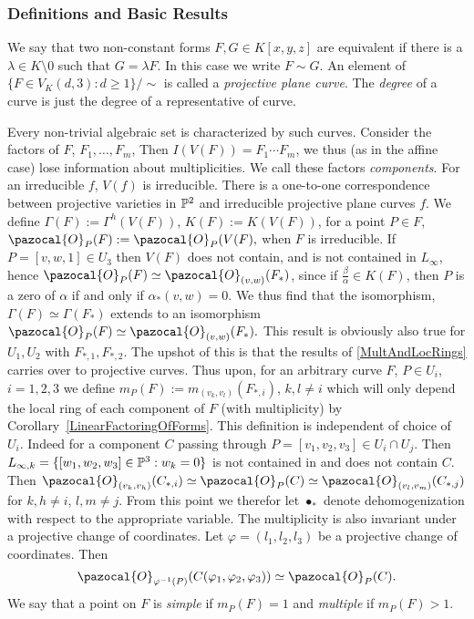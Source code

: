 \subsubsection{Definitions and Basic Results}
    \begin{definition}
        We say that two non-constant forms $F,G\in K[x,y,z]$ are equivalent if there is a $\lambda\in K\setminus 0$ such that $G=\lambda F$. In this case we write $F\sim G$. An element of $\{F \in V_K(d,3): d\geq 1\}/\sim$ is called a \textit{projective plane curve}. The \textit{degree} of a curve is just the degree of a representative of curve.  
    \end{definition}
    \begin{remark}
        Every non-trivial algebraic set is characterized by such curves. Consider the factors of $F$, $F_1,\dots,F_m$, Then $I(V(F))=F_1\cdots F_m$, we thus (as in the affine case) lose information about multiplicities. We call these factors \textit{components}. For an irreducible $f$, $V(f)$ is irreducible. There is a one-to-one correspondence between projective varieties in $\mathbb{P}^2$ and irreducible projective plane curves $f$. We define $\Gamma(F):= \Gamma^h(V(F))$, $K(F):=K(V(F))$, for a point $P\in F$, $\pazocal{O}_P(F):=\pazocal{O}_P(V(F),$ when $F$ is irreducible. If $P=[v,w,1]\in U_3$ then $V(F)$ does not contain, and is not contained in $L_\infty$, hence $\pazocal{O}_P(F)\simeq \pazocal{O}_{(v,w)}(F_\ast)$, since if $\frac{\beta}{\alpha}\in K(F)$, then $P$ is a zero of $\alpha$ if and only if $\alpha_\ast(v,w)=0$. We thus find that the isomorphism, $\Gamma(F)\simeq \Gamma(F_\ast)$ extends to an isomorphism $\pazocal{O}_P(F)\simeq \pazocal{O}_{(v,w)}(F_\ast).$ This result is obviously also true for $U_1,U_2$ with $F_{\ast,1},F_{\ast,2}$. The upshot of this is that the results of \ref{MultAndLocRings} carries over to projective curves. Thus upon, for an arbitrary curve $F$, $P\in U_i$, $i=1,2,3$ we define $m_P(F):= m_{(v_k,v_l)}(F_{\ast,i})$, $k,l\neq i$ which will only depend the local ring of each component of $F$ (with multiplicity) by Corollary~\ref{LinearFactoringOfForms}. This definition is independent of choice of 
        $U_i$. Indeed for a component $C$ passing through $P = [v_1,v_2,v_3]\in U_i\cap U_j$. Then $L_{\infty,k}=\{[w_1,w_2,w_3]\in\mathbb{P}^3 : w_k=0\}$ is not contained in and does not contain 
        $C$. Then $\pazocal{O}_{(v_k,v_h)}(C_{\ast,i})\simeq \pazocal{O}_{P}
        (C)\simeq \pazocal{O}_{(v_l,v_m)}(C_{\ast,j})$ for $k,h\neq i$, $l,m\neq j$. From this point we therefor let $\bullet_\ast$ denote dehomogenization with respect to the appropriate variable. The multiplicity is also invariant under a projective change of coordinates. 
        Let $\varphi=(l_1,l_2,l_3)$ be a projective change of coordinates. Then 
        $$\pazocal{O}_{\varphi^{-1}(P)}(C(\varphi_1,\varphi_2,\varphi_3))\simeq \pazocal{O}_P(C).$$
         We say that a point on $F$ is \textit{simple} if $m_P(F)=1$ and \textit{multiple} if $m_P(F)>1$.
    \end{remark}
